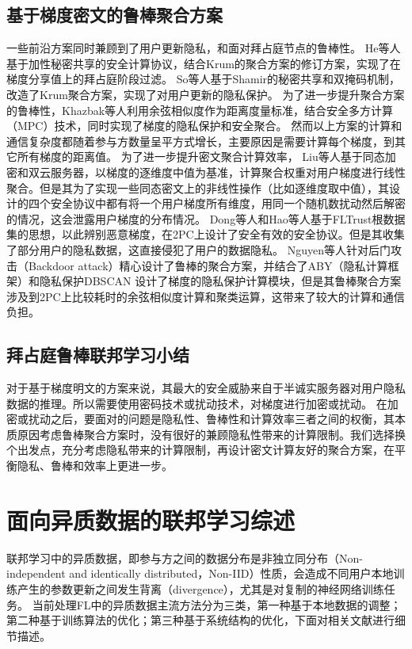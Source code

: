 \subsection{基于梯度密文的鲁棒聚合方案}
一些前沿方案同时兼顾到了用户更新隐私，和面对拜占庭节点的鲁棒性。
He等人基于加性秘密共享的安全计算协议，结合Krum的聚合方案的修订方案，实现了在梯度分享值上的拜占庭阶段过滤。
So等人基于Shamir的秘密共享和双掩码机制，改造了Krum聚合方案，实现了对用户更新的隐私保护。
为了进一步提升聚合方案的鲁棒性，Khazbak等人\cite{khazbak2020mlguard}利用余弦相似度作为距离度量标准，结合安全多方计算（MPC）技术，同时实现了梯度的隐私保护和安全聚合。
然而以上方案的计算和通信复杂度都随着参与方数量呈平方式增长，主要原因是需要计算每个梯度，到其它所有梯度的距离值。
为了进一步提升密文聚合计算效率，
Liu等人\cite{liu2021privacy}基于同态加密和双云服务器，以梯度的逐维度中值为基准，计算聚合权重对用户梯度进行线性聚合。但是其为了实现一些同态密文上的非线性操作（比如逐维度取中值），其设计的四个安全协议中都有将一个用户梯度所有维度，用同一个随机数扰动然后解密的情况，这会泄露用户梯度的分布情况。
Dong等人\cite{dong2021flod}和Hao等人\cite{hao2021efficient}基于FLTrust\cite{DBLP:conf/ndss/CaoF0G21}根数据集的思想，以此辨别恶意梯度，在2PC上设计了安全有效的安全协议。但是其收集了部分用户的隐私数据，这直接侵犯了用户的数据隐私。
Nguyen等人\cite{nguyen2022flame}针对后门攻击（Backdoor attack）精心设计了鲁棒的聚合方案，并结合了ABY\cite{demmler2015aby}（隐私计算框架）和隐私保护DBSCAN \cite{bozdemir2021privacy}设计了梯度的隐私保护计算模块，但是其鲁棒聚合方案涉及到2PC上比较耗时的余弦相似度计算和聚类运算，这带来了较大的计算和通信负担。

\subsection{拜占庭鲁棒联邦学习小结}
对于基于梯度明文的方案来说，其最大的安全威胁来自于半诚实服务器对用户隐私数据的推理\cite{geiping2020inverting}。所以需要使用密码技术或扰动技术，对梯度进行加密或扰动。
在加密或扰动之后，要面对的问题是隐私性、鲁棒性和计算效率三者之间的权衡，其本质原因考虑鲁棒聚合方案时，没有很好的兼顾隐私性带来的计算限制。我们选择换个出发点，充分考虑隐私带来的计算限制，再设计密文计算友好的聚合方案，在平衡隐私、鲁棒和效率上更进一步。

\section{面向异质数据的联邦学习综述}
\label{sec:noniid}
联邦学习中的异质数据，即参与方之间的数据分布是非独立同分布（Non-independent and identically distributed，Non-IID）性质，会造成不同用户本地训练产生的参数更新之间发生背离（divergence），尤其是对复制的神经网络训练任务。
当前处理FL中的异质数据主流方法分为三类，第一种基于本地数据的调整；第二种基于训练算法的优化；第三种基于系统结构的优化，下面对相关文献进行细节描述。

